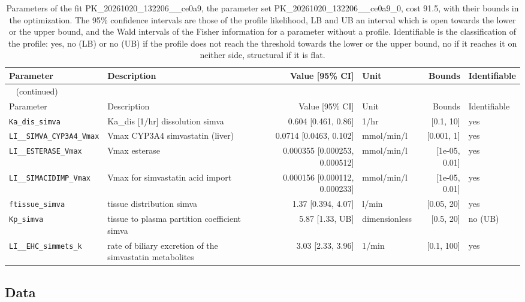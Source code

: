 \documentclass{article}
\begin{document}
\begin{longtable}{llrlrl}
\caption{Parameters of the fit PK\_20261020\_132206\_\_ce0a9, the parameter set PK\_20261020\_132206\_\_ce0a9\_0, cost 91.5, with their bounds in the optimization. The 95\% confidence intervals are those of the profile likelihood, LB and UB an interval which is open towards the lower or the upper bound, and the Wald intervals of the Fisher information for a parameter without a profile. Identifiable is the classification of the profile: yes, no (LB) or no (UB) if the profile does not reach the threshold towards the lower or the upper bound, no if it reaches it on neither side, structural if it is flat.}\label{tab:parameters:PK_20261020_132206__ce0a9} \\
\toprule
Parameter & Description & Value [95\% CI] & Unit & Bounds & Identifiable \\
\midrule
\endfirsthead
\multicolumn{6}{l}{\small\tablename~\thetable{} (continued)} \\
\toprule
Parameter & Description & Value [95\% CI] & Unit & Bounds & Identifiable \\
\midrule
\endhead
\bottomrule
\endlastfoot
\texttt{Ka\_dis\_simva} & Ka\_dis [1/hr] dissolution simva & 0.604 [0.461, 0.86] & 1/hr & [0.1, 10] & yes \\
\texttt{LI\_\_SIMVA\_CYP3A4\_Vmax} & Vmax CYP3A4 simvastatin (liver) & 0.0714 [0.0463, 0.102] & mmol/min/l & [0.001, 1] & yes \\
\texttt{LI\_\_ESTERASE\_Vmax} & Vmax esterase & 0.000355 [0.000253, 0.000512] & mmol/min/l & [1e-05, 0.01] & yes \\
\texttt{LI\_\_SIMACIDIMP\_Vmax} & Vmax for simvastatin acid import & 0.000156 [0.000112, 0.000233] & mmol/min/l & [1e-05, 0.01] & yes \\
\texttt{ftissue\_simva} & tissue distribution simva & 1.37 [0.394, 4.07] & l/min & [0.05, 20] & yes \\
\texttt{Kp\_simva} & tissue to plasma partition coefficient simva & 5.87 [1.33, UB] & dimensionless & [0.5, 20] & no (UB) \\
\texttt{LI\_\_EHC\_simmets\_k} & rate of biliary excretion of the simvastatin metabolites & 3.03 [2.33, 3.96] & 1/min & [0.1, 100] & yes \\
\end{longtable}

\subsection{Data}
\end{document}

